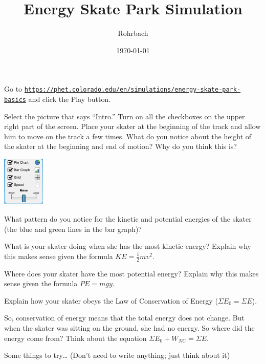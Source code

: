 \documentclass[10pt]{exam}
\title{Energy Skate Park Simulation}
\author{Rohrbach}
\date{\today}
\begin{document}
\maketitle


\noindent
Go to \texttt{\href{https://phet.colorado.edu/en/simulations/energy-skate-park-basics}{https://phet.colorado.edu/en/simulations/energy-skate-park-basics}} and click the Play button.

\begin{questions}

\question
	Select the picture that says ``Intro.''  Turn on all the checkboxes on the upper right part of the screen. Place your skater at the beginning of the track and allow him to move on the track a few times.  What do you notice about the height of the skater at the beginning and end of motion?  Why do you think this is?
  
  \begin{flushright}
    \includegraphics[width=2cm]{PhET_checkboxes.png}
  \end{flushright}

\question
	What pattern do you notice for the kinetic and potential energies of the skater (the blue and green lines in the bar graph)?
  \vs

\question
	What is your skater doing when she has the most kinetic energy?  Explain why this makes sense given the formula $KE=\frac{1}{2}mv^2$.
  \vs 

\question
	Where does your skater have the most potential energy?  Explain why this makes sense given the formula $PE=mgy$.
  \vs 

\question
	Explain how your skater obeys the Law of Conservation of Energy ($\Sigma E_0 = \Sigma E$).
  \vs 

\pagebreak


\question
	So, conservation of energy means that the total energy does not change.  But when the skater was sitting on the ground, she had no energy.  So where did the energy come from?  Think about the equation $\Sigma E_0 + W_{NC} = \Sigma E$.
  \vs 


\question
  Some things to try… (Don't need to write anything; just think about it)

  \begin{minipage}{5in}
    \begin{parts}

\end{parts}
\end{minipage}
\end{questions}
\end{document}
